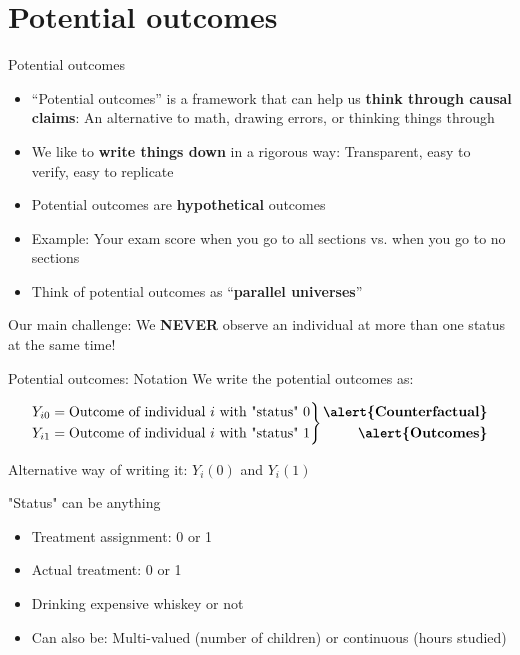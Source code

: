 \documentclass[11pt]{beamer}
\newenvironment{rcases}
  {\left.\begin{aligned}}
  {\end{aligned}\right\rbrace}
\newenvironment{rcasesx}
  {\left.\begin{aligned}}
  {\end{aligned}\right.}
\begin{document}
\section{Potential outcomes}
\begin{frame}{Potential outcomes}
    \begin{itemize}
        \item   ``Potential outcomes'' is a framework that can help us \textbf{think through causal claims}: An alternative to math, drawing errors, or thinking things through 
        \item We like to \textbf{write things down} in a rigorous way: Transparent, easy to verify, easy to replicate 
        \item Potential outcomes are {\alert{\textbf{hypothetical}}} outcomes 
        \item Example: Your exam score when you go to all sections vs. when you go to no sections 
        \item Think of potential outcomes as ``\alert{\textbf{parallel universes}}'' 
    \end{itemize}
Our main challenge: We {\color{red}\textbf{\Large{NEVER}}} observe an individual at more than one status at the same time!

\end{frame}







\begin{frame}{Potential outcomes: Notation}
    We write the potential outcomes as:

\begin{align*}
\begin{rcases}
Y_{i0} &= \text{Outcome of individual $i$ with "status" 0} \\
Y_{i1} &= \text{Outcome of individual $i$ with "status" 1} 
\end{rcases}
\begin{rcasesx}
\text{\textbf{\alert{Counterfactual}}} \\
\text{\textbf{\alert{Outcomes}}}
\end{rcasesx}
\end{align*}


Alternative way of writing it: $Y_i(0)$ and $Y_i(1)$

 
    "Status" can be anything
    \begin{itemize}
        \item   Treatment assignment: 0 or 1
        \item Actual treatment: 0 or 1
        \item Drinking expensive whiskey or not
        \item Can also be: Multi-valued (number of children) or continuous (hours studied)
    \end{itemize}


\end{frame}
\end{document}
